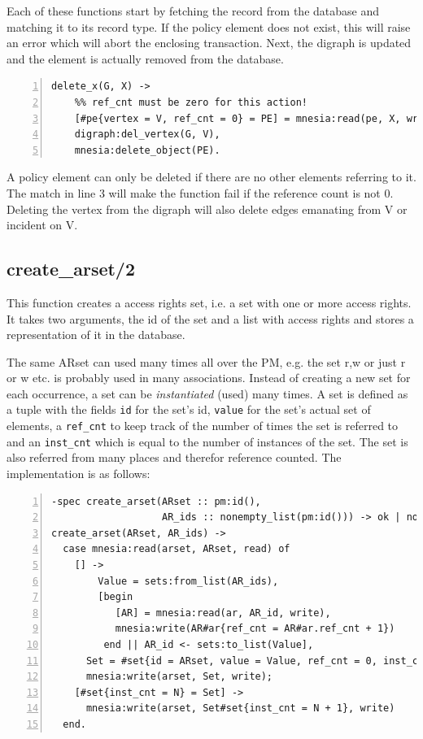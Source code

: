 \documentclass[12pt,a4paper,titlepage]{book}
\begin{document}
	Each of these functions start by fetching the record from the database and matching it to its record type. If the policy element does not exist, this will raise an error which will abort the enclosing transaction. Next, the digraph is updated and the element is actually removed from the database.
	
	\begin{lstlisting}[caption={delete\_x/2}, basicstyle=\footnotesize, breaklines=false, numbers=left]
delete_x(G, X) ->
    %% ref_cnt must be zero for this action!  
    [#pe{vertex = V, ref_cnt = 0} = PE] = mnesia:read(pe, X, write),
    digraph:del_vertex(G, V),
    mnesia:delete_object(PE). \end{lstlisting}
    
    A policy element can only be deleted if there are no other elements referring to it. The match in line 3 will make the function fail if the reference count is not 0. Deleting the vertex from the digraph will also delete edges emanating from V or incident on V.

	\subsection{create\_arset/2}
	
	This function creates a access rights set, i.e. a set with one or more access rights. It takes two arguments, the id of the set and a list with access rights and stores a representation of it in the database.
	
	The same ARset can used many times all over the PM, e.g. the set {r,w} or just {r} or {w} etc. is probably used in many associations. Instead of creating a new set for each occurrence, a set can be \emph{instantiated} (used) many times.  A set is defined as a tuple with the fields \lstinline|id| for the set's id, \lstinline|value| for the set's actual set of elements, a \lstinline|ref_cnt|  to keep track of the number of times the set is referred to and an \lstinline|inst_cnt| which is equal to the number of instances of the set. The set is also referred from many places and therefor reference counted. The implementation is as follows:
	
	\begin{lstlisting}[caption={delete\_u/2}, basicstyle=\footnotesize, breaklines=false, numbers=left]
-spec create_arset(ARset :: pm:id(),
                   AR_ids :: nonempty_list(pm:id())) -> ok | no_return().
create_arset(ARset, AR_ids) ->
  case mnesia:read(arset, ARset, read) of
    [] ->
	    Value = sets:from_list(AR_ids),
        [begin 
           [AR] = mnesia:read(ar, AR_id, write),
           mnesia:write(AR#ar{ref_cnt = AR#ar.ref_cnt + 1})
         end || AR_id <- sets:to_list(Value],
      Set = #set{id = ARset, value = Value, ref_cnt = 0, inst_cnt = 1},
      mnesia:write(arset, Set, write);
    [#set{inst_cnt = N} = Set] ->
      mnesia:write(arset, Set#set{inst_cnt = N + 1}, write)
  end. \end{lstlisting}
	
\end{document}

